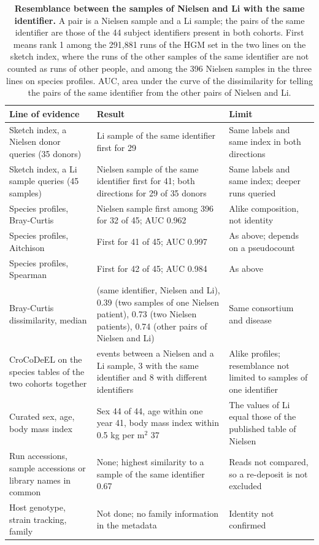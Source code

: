 \documentclass[11pt,a4paper]{article}
\begin{document}
\setcounter{table}{6}
\begin{table}[!htbp]\centering\footnotesize\setlength{\tabcolsep}{4pt}
\caption[Resemblance between the samples of Nielsen and Li with the same identifier]{\textbf{Resemblance between the samples of Nielsen and Li with the same identifier.} A pair is a Nielsen sample and a Li sample; the pairs of the same identifier are those of the 44 subject identifiers present in both cohorts. First means rank 1 among the 291,881 runs of the HGM set in the two lines on the sketch index, where the runs of the other samples of the same identifier are not counted as runs of other people, and among the 396 Nielsen samples in the three lines on species profiles. AUC, area under the curve of the dissimilarity for telling the pairs of the same identifier from the other pairs of Nielsen and Li.}
\begin{tabular}{>{\raggedright\arraybackslash}p{4.3cm}>{\raggedright\arraybackslash}p{6.4cm}>{\raggedright\arraybackslash}p{4.4cm}}
\toprule
Line of evidence & Result & Limit \\
\midrule
Sketch index, a Nielsen donor queries (35 donors) & Li sample of the same identifier first for 29 & Same labels and same index in both directions \\
Sketch index, a Li sample queries (45 samples) & Nielsen sample of the same identifier first for 41; both directions for 29 of 35 donors & Same labels and same index; deeper runs queried \\
Species profiles, Bray-Curtis & Nielsen sample first among 396 for 32 of 45; AUC 0.962 & Alike composition, not identity \\
Species profiles, Aitchison & First for 41 of 45; AUC 0.997 & As above; depends on a pseudocount \\
Species profiles, Spearman & First for 42 of 45; AUC 0.984 & As above \\
Bray-Curtis dissimilarity, median & 0.42 (same identifier, Nielsen and Li), 0.39 (two samples of one Nielsen patient), 0.73 (two Nielsen patients), 0.74 (other pairs of Nielsen and Li) & Same consortium and disease \\
CroCoDeEL on the species tables of the two cohorts together & 11 events between a Nielsen and a Li sample, 3 with the same identifier and 8 with different identifiers & Alike profiles; resemblance not limited to samples of one identifier \\
Curated sex, age, body mass index & Sex 44 of 44, age within one year 41, body mass index within 0.5 kg per m$^2$ 37 & The values of Li equal those of the published table of Nielsen \\
Run accessions, sample accessions or library names in common & None; highest similarity to a sample of the same identifier 0.67 & Reads not compared, so a re-deposit is not excluded \\
Host genotype, strain tracking, family & Not done; no family information in the metadata & Identity not confirmed \\
\bottomrule
\end{tabular}
\end{table}
\end{document}
